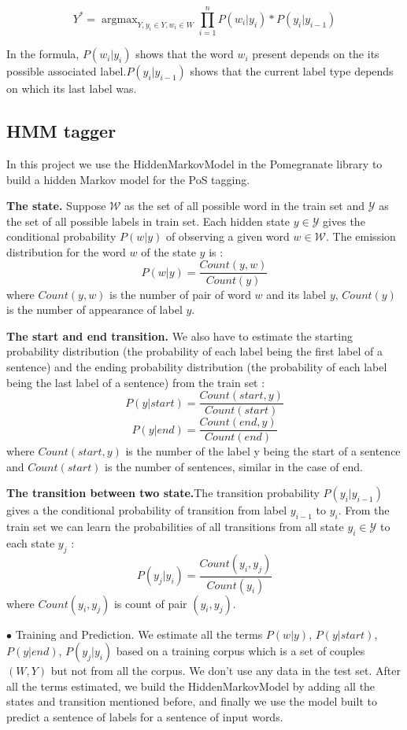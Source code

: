 \documentclass{article}
\def\WW{{\mathcal{W}}}
\def\YY{{\mathcal{Y}}}
\begin{document}
\begin{equation}
Y^* = \mathop{\arg\max}_{Y, y_i \in Y, w_i \in W} \prod_{i=1}^n P(w_i|y_i)*P(y_i|y_{i-1})
\end{equation}

In the formula, $P(w_i|y_i)$ shows that the word $w_i$ present depends on the its possible associated label.$P(y_i|y_{i-1})$ shows that the current label type depends on which its last label was.

\subsection{HMM tagger}
In this project we use the HiddenMarkovModel in the Pomegranate library to build a hidden Markov model for the PoS tagging.

\textbf{The state.} Suppose $\WW$ as the set of all possible word in the train set and $\YY$ as the set of all possible labels in train set. Each hidden state $y \in \YY$ gives the conditional probability $P(w|y)$ of observing a given word $w \in \WW$. The emission distribution for the word $w$ of the state $y$ is : $$P(w|y) = \frac{Count(y,w)}{Count(y)}$$ where $Count(y,w)$ is the number of pair of word $w$ and its label $y$, $Count(y)$ is the number of appearance of label $y$.

\textbf{The start and end transition.} We also have to estimate the starting probability distribution (the probability of each label being the first label of a sentence) and the ending probability distribution (the probability of each label being the last label of a sentence) from the train set : $$P(y|start) = \frac{Count(start, y)}{Count(start)}$$ 
$$P(y|end) = \frac{Count(end, y)}{Count(end)}$$ where $Count(start, y)$ is the number of the label y being the start of a sentence and $Count(start)$ is the number of sentences, similar in the case of end.

\textbf{The transition between two state.}The transition probability $P(y_i|y_{i-1})$ gives a the conditional probability of transition from label $y_{i-1}$ to $y_i$. From the train set we can learn the probabilities of all transitions from all state $y_i \in \YY$ to each state $y_j$ :
$$P(y_j|y_i) = \frac{Count(y_i, y_j)}{Count(y_i)}$$ where $Count(y_i, y_j)$ is count of pair $(y_i, y_j)$.

$\bullet$ Training and Prediction. We estimate all the terms $P(w|y)$, $P(y|start)$, $P(y|end)$, $P(y_j|y_i)$ based on a training corpus which is a set of couples $(W, Y)$ but not from all the corpus. We don't use any data in the test set. After all the terms estimated, we build the HiddenMarkovModel by adding all the states and transition mentioned before, and finally we use the model built to predict a sentence of labels for a sentence of input words.
\end{document}
